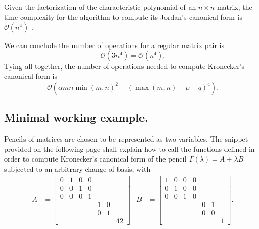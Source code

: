 \begin{remark}
    Given the factorization of the characteristic polynomial of an \(n \times n\) matrix, the time complexity
    for the algorithm to compute its Jordan's canonical form is \(\mathcal{O}(n^4)\)
    \cite{DBLP:journals/corr/abs-cs-0412005}.
\end{remark}

We can conclude the number of operations for a regular matrix pair is
\[
    \mathcal{O}(3n^4) = \mathcal{O}(n^4).
\]
Tying all together, the number of operations needed to compute Kronecker's canonical form is
\[
    \mathcal{O}(\alpha mn \min(m, n)^2 + (\max(m, n) - p - q)^4).
\]

\subsection*{Minimal working example.}
Pencils of matrices are chosen to be represented as two variables. The snippet provided on the following page
shall explain how to call the functions defined in order to compute Kronecker's canonical form of the pencil
\(\Gamma(\lambda) = A + \lambda B\) subjected to an arbitrary change of basis, with
\begin{align*}
    A &=
    \begin{bmatrix}
        0 & 1 & 0 & 0 \\
        0 & 0 & 1 & 0 \\
        0 & 0 & 0 & 1 \\
        & & & & 1 & 0 \\
        & & & & 0 & 1 \\
        & & & & & & 42
    \end{bmatrix} &
    B &=
    \begin{bmatrix}
        1 & 0 & 0 & 0 \\
        0 & 1 & 0 & 0 \\
        0 & 0 & 1 & 0 \\
        & & & & 0 & 1 \\
        & & & & 0 & 0 \\
        & & & & & & 1
    \end{bmatrix}.
\end{align*}
\pagebreak
